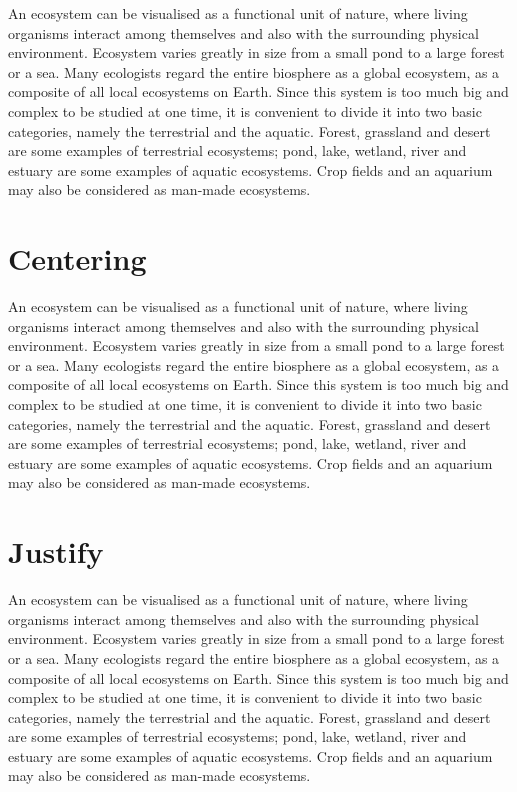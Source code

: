 \documentclass[12pt]{article}
\begin{document}
	\begin{flushright}
		An ecosystem can be visualised as a functional unit of nature, where living 
		organisms interact among themselves and also with the surrounding physical 
		environment. Ecosystem varies greatly in size from a small pond to a large forest or a 
		sea. Many ecologists regard the entire biosphere as a global ecosystem, as a composite 
		of all local ecosystems on Earth. Since this system is too much big and complex to be 
		studied at one time, it is convenient to divide it into two basic categories, namely the 
		terrestrial and the aquatic. Forest, grassland and desert are some examples of terrestrial 
		ecosystems; pond, lake, wetland, river and estuary are some examples of aquatic 
		ecosystems. Crop fields and an aquarium may also be considered as man-made 
		ecosystems.
	\end{flushright}
	
	\newpage
	\section{Centering}
	
	\centering
	 An ecosystem can be visualised as a functional unit of nature, where living 
	 organisms interact among themselves and also with the surrounding physical 
	 environment. Ecosystem varies greatly in size from a small pond to a large forest or a 
	 sea. Many ecologists regard the entire biosphere as a global ecosystem, as a composite 
	 of all local ecosystems on Earth. Since this system is too much big and complex to be 
	 studied at one time, it is convenient to divide it into two basic categories, namely the 
	 terrestrial and the aquatic. Forest, grassland and desert are some examples of terrestrial 
	 ecosystems; pond, lake, wetland, river and estuary are some examples of aquatic 
	 ecosystems. Crop fields and an aquarium may also be considered as man-made 
	 ecosystems.
	 
	\section{Justify}
	
	\justifying
	
	An ecosystem can be visualised as a functional unit of nature, where living 
	organisms interact among themselves and also with the surrounding physical 
	environment. Ecosystem varies greatly in size from a small pond to a large forest or a 
	sea. Many ecologists regard the entire biosphere as a global ecosystem, as a composite 
	of all local ecosystems on Earth. Since this system is too much big and complex to be 
	studied at one time, it is convenient to divide it into two basic categories, namely the 
	terrestrial and the aquatic. Forest, grassland and desert are some examples of terrestrial 
	ecosystems; pond, lake, wetland, river and estuary are some examples of aquatic 
	ecosystems. Crop fields and an aquarium may also be considered as man-made 
	ecosystems.
	 
\end{document}
